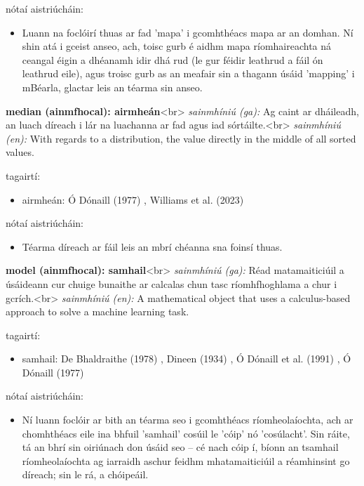 \documentclass{article}
\begin{document}
nótaí aistriúcháin:
\begin{itemize}
	\item Luann na foclóirí thuas ar fad 'mapa' i gcomhthéacs mapa ar an domhan. Ní shin atá i gceist anseo, ach, toisc gurb é aidhm mapa ríomhaireachta ná ceangal éigin a dhéanamh idir dhá rud (le gur féidir leathrud a fáil ón leathrud eile), agus troisc gurb as an meafair sin a thagann úsáid 'mapping' i mBéarla, glactar leis an téarma sin anseo.
\end{itemize}


\textbf{median (ainmfhocal): airmheán}<br>
\textit{sainmhíniú (ga):} Ag caint ar dháileadh, an luach díreach i lár na luachanna ar fad agus iad sórtáilte.<br>
\textit{sainmhíniú (en):} With regards to a distribution, the value directly in the middle of all sorted values.

tagairtí:
\begin{itemize}
	\item airmheán: Ó Dónaill (1977) \cite{odonaill}, Williams et al. (2023) \cite{storchiste}
\end{itemize}

nótaí aistriúcháin:
\begin{itemize}
	\item Téarma díreach ar fáil leis an mbrí chéanna sna foinsí thuas.
\end{itemize}


\textbf{model (ainmfhocal): samhail}<br>
\textit{sainmhíniú (ga):} Réad matamaiticiúil a úsáideann cur chuige bunaithe ar calcalas chun tasc ríomhfhoghlama a chur i gcrích.<br>
\textit{sainmhíniú (en):} A mathematical object that uses a calculus-based approach to solve a machine learning task.

tagairtí:
\begin{itemize}
	\item samhail: De Bhaldraithe (1978) \cite{de-bhaldraithe}, Dineen (1934) \cite{dineen}, Ó Dónaill et al. (1991) \cite{focloir-beag}, Ó Dónaill (1977) \cite{odonaill}
\end{itemize}

nótaí aistriúcháin:
\begin{itemize}
	\item Ní luann foclóir ar bith an téarma seo i gcomhthéacs ríomheolaíochta, ach ar chomhthéacs eile ina bhfuil 'samhail' cosúil le 'cóip' nó 'cosúlacht'. Sin ráite, tá an bhrí sin oiriúnach don úsáid seo -- cé nach cóip í, bíonn an tsamhail ríomheolaíochta ag iarraidh aschur feidhm mhatamaiticiúil a réamhinsint go díreach; sin le rá, a chóipeáil.
\end{itemize}
\end{document}
